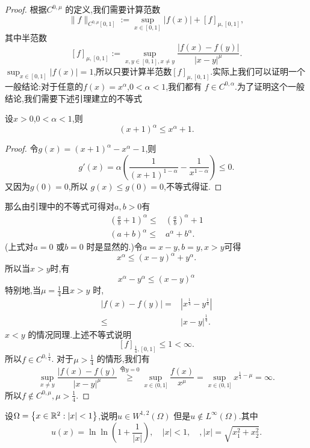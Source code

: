 \begin{proof}
  根据$C^{0,\mu}$ 的定义,我们需要计算范数
  \[
    \|f\|_{C^{0,\mu}[0,1]}:=\sup_{x\in [0,1]}|f(x)|+[f]_{\mu,[0,1]},
  \] 
  其中半范数
  \[
    [f]_{\mu,[0,1]}:=\sup_{x,y\in [0,1],x\neq y} \frac{|f(x)-f(y)|}{|x-y|^{\mu}}.
  \]
  $\sup_{x\in [0,1]}|f(x)|=1$,所以只要计算半范数$[f]_{\mu,[0,1]}$.实际上我们可以证明一个一般结论:对于任意的$f(x)=x^{\alpha}$,$0<\alpha<1$,我们都有 $f\in C^{0,\alpha}$.为了证明这个一般结论,我们需要下述引理建立的不等式
  \begin{framed}
    \small\itshape
    \begin{lemma}
      设$x>0$,$0<\alpha<1$,则
      \[
	(x+1)^{\alpha}\le x^{\alpha}+1.
      \] 
    \end{lemma}
    \begin{proof}
      令$g(x)=(x+1)^{\alpha}-x^{\alpha}-1$,则
      \[
	g'(x)=\alpha \left( \frac{1}{(x+1)^{1-\alpha}}-\frac{1}{x^{1-\alpha}} \right) \le 0.
      \] 
      又因为$g(0)=0$,所以 $g(x)\le g(0)=0$,不等式得证.
    \end{proof}
  \end{framed}
  那么由引理中的不等式可得对$a,b>0$有
  \begin{align*}
  \left (\frac{a}{b}+1\right)^{\alpha}\le&\left(\frac{a}{b}\right)^{\alpha}+1\\
  (a+b)^{\alpha}\le &a^{\alpha}+b^{\alpha}.
  \end{align*}
  (上式对$a=0$ 或$b=0$ 时是显然的.)令$a=x-y,b=y,x>y$可得
   \[
     x^{\alpha}\le (x-y)^{\alpha}+y^{\alpha}.
   \]
   所以当$x>y$时,有
    \[
      x^{\alpha}-y^{\alpha}\le (x-y)^{\alpha}
   \] 
 特别地,当$\mu=\frac{1}{4}$且$x>y$ 时,
  \begin{align*}
    |f(x)-f(y)|=&|x^{\frac{1}{4}}-y^{\frac{1}{4}}|\\
    \le  & |x-y|^{\frac{1}{4}}
  .\end{align*}
  $x<y$ 的情况同理.上述不等式说明\[
    [f]_{\frac{1}{4},[0,1]}\le 1<\infty.
  \] 
  所以$f\in C^{0,\frac{1}{4}}$.
  对于$\mu>\frac{1}{4}$ 的情形,我们有
  \[
    \sup_{x\neq y} \frac{|f(x)-f(y)}{|x-y|^{\mu}}\overset{\text{令}y=0}{\ge }\sup_{x\in (0,1]} \frac{f(x)}{x^{\mu}}=\sup_{x\in (0,1]}x^{\frac{1}{4}-\mu}=\infty.
  \]  
  所以$f\notin C^{0,\mu},\mu>\frac{1}{4}$.
\end{proof}
\begin{exercise}
  设$\Omega =\left\{ x\in \mathbb{R}^{2}:|x|<1 \right\} $,说明$u\in W^{1,2}(\Omega)$ 但是$u \notin L^{\infty}(\Omega)$.其中
  \[
    u(x)=\ln \ln (1+\frac{1}{|x|}),\quad |x|<1,\quad,|x|=\sqrt{x_1^2+x^2_2}. 
  \]
\end{exercise}
